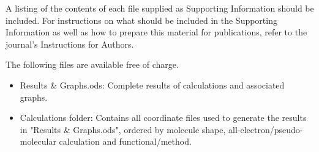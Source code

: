 \documentclass[journal=jctcce,manuscript=article]{achemso}
\begin{document}
\begin{suppinfo}

A listing of the contents of each file supplied as Supporting Information
should be included. For instructions on what should be included in the
Supporting Information as well as how to prepare this material for
publications, refer to the journal's Instructions for Authors.

The following files are available free of charge.
\begin{itemize}
  \item Results \& Graphs.ods: Complete results of calculations and associated graphs.
  \item Calculations folder: Contains all coordinate files used to generate the results in "Results \& Graphs.ods", ordered by molecule
  shape, all-electron/pseudo-molecular calculation and functional/method.
\end{itemize}

\end{suppinfo}


\end{document}

